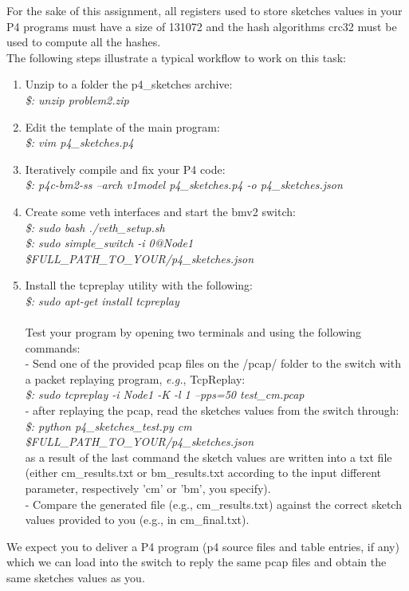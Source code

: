 For the sake of this assignment, all registers used to store sketches values in your P4 programs must have a size of 131072 and the hash algorithms crc32 must be used to compute all the hashes.\\

The following steps illustrate a typical workflow to work on this task:
\begin{enumerate}
\item Unzip to a folder the p4\_sketches archive:\\
        \textit{\$: unzip problem2.zip} 
\item Edit the template of the main program:\\
        \textit{\$: vim p4\_sketches.p4}
\item Iteratively compile and fix your P4 code:\\
        \textit{\$: p4c-bm2-ss --arch v1model p4\_sketches.p4 -o p4\_sketches.json}
\item Create some veth interfaces and start the bmv2 switch:\\
        \textit{\$: sudo bash ./veth\_setup.sh}\\
        \textit{\$: sudo simple\_switch -i 0@Node1 \$FULL\_PATH\_TO\_YOUR/p4\_sketches.json}
\item Install the tcpreplay utility with the following:\\
        \textit{\$: sudo apt-get install tcpreplay}\\~\\
Test your program by opening two terminals and using the following commands:\\

- Send one of the provided pcap files on the /pcap/ folder to the switch with a packet replaying program, \textit{e.g.}, TcpReplay:\\

        \textit{\$: sudo tcpreplay -i Node1 -K -l 1 --pps=50 test\_cm.pcap}\\

- after replaying the pcap, read the sketches values from the switch through:\\

        \textit{\$: python p4\_sketches\_test.py cm \$FULL\_PATH\_TO\_YOUR/p4\_sketches.json}\\

as a result of the last command the sketch values are written into a txt file (either cm\_results.txt or bm\_results.txt according to the input different parameter, respectively 'cm' or 'bm', you specify).\\
- Compare the generated file (e.g., cm\_results.txt) against the correct sketch values provided to you (e.g., in cm\_final.txt).

\end{enumerate}

 We expect you to deliver a P4 program (p4 source files and table entries, if any) which we can load into the switch to reply the same pcap files and obtain the same sketches values as you.